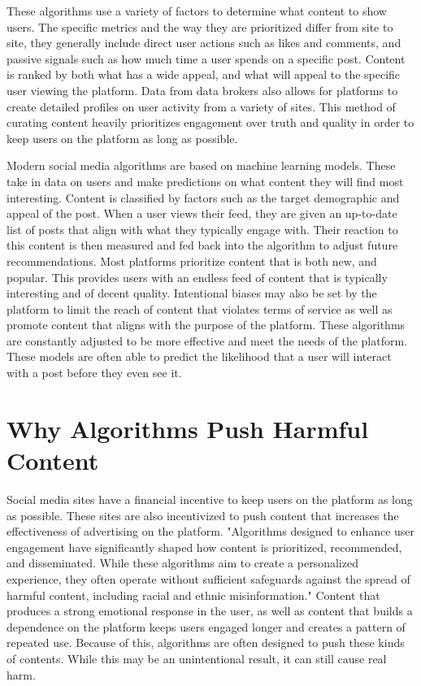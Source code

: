 \documentclass[conference]{IEEEtran}
\begin{document}
These algorithms use a variety of factors to determine what content to show users. The specific metrics and the way they are prioritized differ from site to site, they generally include direct user actions such as likes and comments, and passive signals such as how much time a user spends on a specific post. Content is ranked by both what has a wide appeal, and what will appeal to the specific user viewing the platform. Data from data brokers also allows for platforms to create detailed profiles on user activity from a variety of sites. This method of curating content heavily prioritizes engagement over truth and quality in order to keep users on the platform as long as possible.

Modern social media algorithms are based on machine learning models. These take in data on users and make predictions on what content they will find most interesting. Content is classified by factors such as the target demographic and appeal of the post. When a user views their feed, they are given an up-to-date list of posts that align with what they typically engage with. Their reaction to this content is then measured and fed back into the algorithm to adjust future recommendations. Most platforms prioritize content that is both new, and popular. This provides users with an endless feed of content that is typically interesting and of decent quality. Intentional biases may also be set by the platform to limit the reach of content that violates terms of service as well as promote content that aligns with the purpose of the platform. These algorithms are constantly adjusted to be more effective and meet the needs of the platform. These models are often able to predict the likelihood that a user will interact with a post before they even see it.

\section{Why Algorithms Push Harmful Content}
Social media sites have a financial incentive to keep users on the platform as long as possible. These sites are also incentivized to push content that increases the effectiveness of advertising on the platform. "Algorithms  designed  to  enhance  user  engagement  have  significantly  shaped  how content  is  prioritized, recommended, and disseminated. While these algorithms aim  to  create a  personalized experience, they often operate  without  sufficient safeguards against the spread of  harmful content,  including racial  and ethnic misinformation."\cite{Lucas2024} Content that produces a strong emotional response in the user, as well as content that builds a dependence on the platform keeps users engaged longer and creates a pattern of repeated use. Because of this, algorithms are often designed to push these kinds of contents. While this may be an unintentional result, it can still cause real harm.
\end{document}

